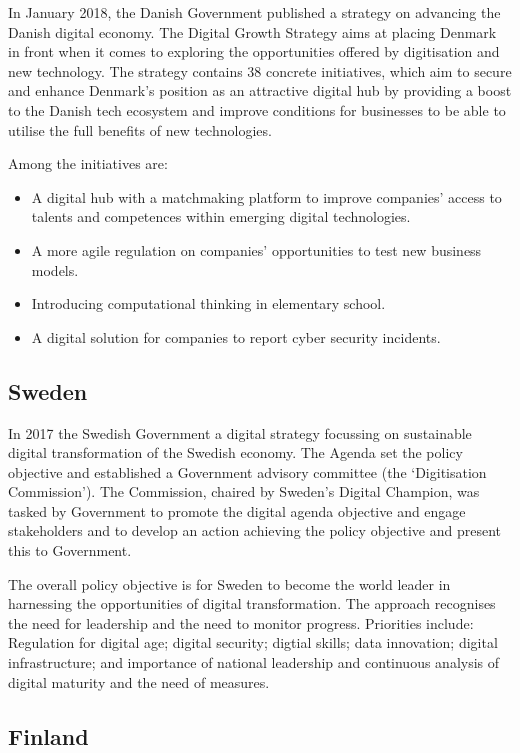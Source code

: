 In January 2018, the Danish Government published a strategy on advancing the Danish digital economy. The Digital Growth Strategy aims at placing Denmark in front when it comes to exploring the opportunities offered by digitisation and new technology. The strategy contains 38 concrete initiatives, which aim to secure and enhance Denmark's position as an attractive digital hub by providing a boost to the Danish tech ecosystem and improve conditions for businesses to be able to utilise the full benefits of new technologies.

Among the initiatives are:
\begin{itemize}
\item A digital hub with a matchmaking platform to improve companies' access to talents and competences within emerging digital technologies.
\item A more agile regulation on companies' opportunities to test new business models.
\item Introducing computational thinking in elementary school.
\item A digital solution for companies to report cyber security incidents.
\end{itemize}

\subsection{Sweden}

In 2017 the Swedish Government a digital strategy focussing on sustainable digital transformation of the Swedish economy. The Agenda set the policy objective and established a Government advisory committee (the `Digitisation Commission'). The Commission, chaired by Sweden's Digital Champion, was tasked by Government to promote the digital agenda objective and engage stakeholders and to develop an action achieving the policy objective and present this to Government.

The overall policy objective is for Sweden to become the world leader in harnessing the opportunities of digital transformation. The approach recognises the need for leadership and the need to monitor progress. Priorities include: Regulation for digital age; digital security; digtial skills; data innovation; digital infrastructure; and importance of national leadership and continuous analysis of digital maturity and the need of measures.

\subsection{Finland}

